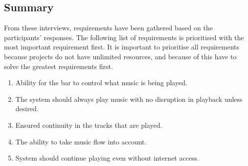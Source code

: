 \subsection{Summary}
\label{sub:summary}

From these interviews, requirements have been gathered based on the
participants' responses. The following list of requirements is
prioritised with the most important requirement first.  It is
important to prioritise all requirements because projects do not have
unlimited resources, and because of this have to solve the greatest
requirements first.

\begin{enumerate}
\item Ability for the bar to control what music is being
    played.
\item The system should always play music with no disruption in playback unless desired.
\item Ensured continuity in the tracks that are played.
\item The ability to take music flow into account.
\item System should continue playing even without internet access.
\end{enumerate}
